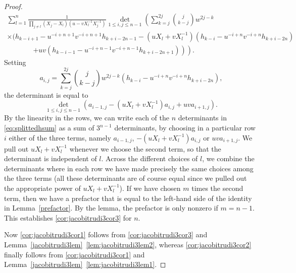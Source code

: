 \documentclass[10pt,a4paper]{amsart}
\begin{document}
\begin{proof}
\begin{multline}
			\sum_{l=1}^n \frac{1}{\prod_{j \not= l} (X_j-X_l)(u-v X_l^{-1} X_j^{-1})} 
			\det_{1 \le i, j \le n-1} \left( \sum_{k=j}^{2j} \binom{j}{k-j} w^{2j-k} \right. \\
			\times ( h_{k-i+1} - u^{-i+n+1} v^{-i+n+1} h_{k+i-2n-1} 
			- (u X_l + v X_l^{-1}) (h_{k-i} - u^{-i+n} v^{-i+n} h_{k+i-2n})  \\
			\left. \phantom{\sum \binom{n}{k}} \left. + u v (h_{k-i-1} - u^{-i+n-1} v^{-i+n-1} h_{k+i-2n+1}) \right) \right).
		\end{multline} 
		Setting 
		\begin{equation*}
		a_{i,j} = \sum_{k=j}^{2j} \binom{j}{k-j} w^{2j-k} (h_{k-i} - u^{-i+n} v^{-i+n} h_{k+i-2n}),
		\end{equation*}
		the determinant is equal to
		\begin{equation*}
		\det_{1 \le i,j \le n-1} \left( a_{i-1,j} - (u X_l + v X_l^{-1}) a_{i,j} + u v a_{i+1,j} \right).
		\end{equation*}
		By the linearity in the rows, we can write each of the $n$ determinants in \eqref{eq:splittedhsum} as a sum of $3^{n-1}$ determinants, by choosing in a particular row $i$ either of the three terms, namely $a_{i-1,j}$, $-(u X_l + v X_l^{-1}) a_{i,j}$ or $u v a_{i+1,j}$. We pull out $u X_l + v X_l^{-1}$ whenever we choose the second term, so that the determinant is independent of $l$. Across the different choices of $l$, we combine the determinants where in each row we have made precisely the same choices among the three terms (all these determinants are of course equal since we pulled out the appropriate power of $u X_l + v X_l^{-1}$). If we have chosen $m$ times the second term, then we have a prefactor that is equal to the left-hand side of the identity in Lemma~\ref{prefactor}. By the lemma, the prefactor is only nonzero if $m=n-1$. This establishes \eqref{cor:jacobitrudi3cor3} for $n$.
		
		Now \eqref{cor:jacobitrudi3cor1} follows from \eqref{cor:jacobitrudi3cor3} and Lemma~\ref{jacobitrudi3lem}~\eqref{lem:jacobitrudi3lem2}, whereas \eqref{cor:jacobitrudi3cor2} finally follows from \eqref{cor:jacobitrudi3cor1} and Lemma~\ref{jacobitrudi3lem}~\eqref{lem:jacobitrudi3lem1}.
	\end{proof} 
\end{document}

